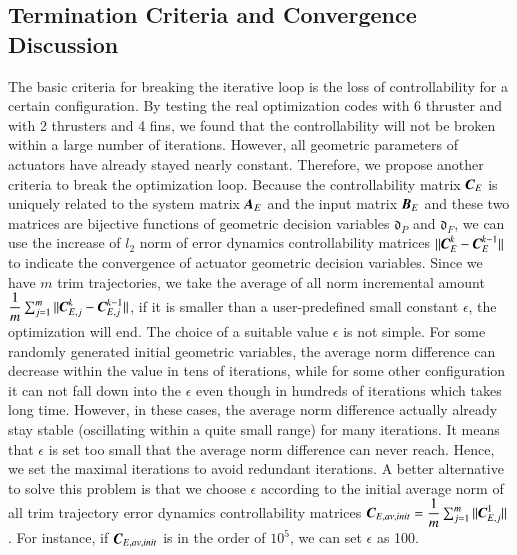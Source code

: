 \subsection{Termination Criteria and Convergence Discussion} 
The basic criteria for breaking the iterative loop is the loss of controllability for a certain configuration. By testing the real optimization codes with 6 thruster and with 2 thrusters and 4 fins, we found that the controllability will not be broken within a large number of iterations. However, all geometric parameters of actuators have already stayed nearly constant. Therefore, we propose another criteria to break the optimization loop. Because the controllability matrix $\emph{\textbf{C}}_{E}$ is uniquely related to the system matrix $\emph{\textbf{A}}_{E}$ and the input matrix $\emph{\textbf{B}}_{E}$ and these two matrices are bijective functions of geometric decision variables $\mathfrak{d}_{P}$ and $\mathfrak{d}_{F}$, we can use the increase of $\mathit{l}_{2}$ norm of error dynamics controllability matrices $||\emph{\textbf{C}}_{E}^{k}-\emph{\textbf{C}}_{E}^{k-1}||$ to indicate the convergence of actuator geometric decision variables. Since we have $m$ trim trajectories, we take the average of all norm incremental amount $\dfrac{1}{m}\sum^{m}_{j=1}||\emph{\textbf{C}}_{E,j}^{k}-\emph{\textbf{C}}_{E,j}^{k-1}||$, if it is smaller than a user-predefined small constant $\epsilon$, the optimization will end. The choice of a suitable value $\epsilon$ is not simple. For some randomly generated initial geometric variables, the average norm difference can decrease within the value in tens of iterations, while for some other configuration it can not fall down into the $\epsilon$ even though in hundreds of iterations which takes long time. However, in these cases, the average norm difference actually already stay stable (oscillating within a quite small range) for many iterations. It means that $\epsilon$ is set too small that the average norm difference can never reach. Hence, we set the maximal iterations to avoid redundant iterations. A better alternative to solve this problem is that we choose $\epsilon$ according to the initial average norm of all trim trajectory error dynamics controllability matrices $\emph{\textbf{C}}_{E,av,init}=\dfrac{1}{m}\sum_{j=1}^{m}||\emph{\textbf{C}}_{E,j}^{1}||$. For instance, if $\emph{\textbf{C}}_{E,av,init}$ is in the order of $10^{5}$, we can set $\epsilon$ as 100.
